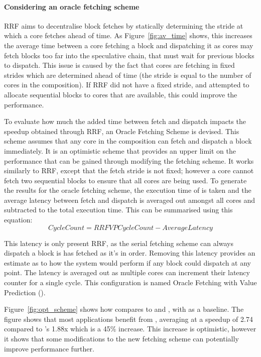 \paragraph*{Considering an oracle fetching scheme}

RRF aims to decentralise block fetches by statically determining the stride at which a core fetches ahead of time.
As Figure~\ref{fig:av_time} shows, this increases the average time between a core fetching a block and dispatching it as cores may fetch blocks too far into the speculative chain, that must wait for previous blocks to dispatch.
This issue is caused by the fact that cores are fetching in fixed strides which are determined ahead of time (the stride is equal to the number of cores in the composition).
If RRF did not have a fixed stride, and attempted to allocate sequential blocks to cores that are available, this could improve the performance. 

To evaluate how much the added time between fetch and dispatch impacts the speedup obtained through RRF, an Oracle Fetching Scheme is devised.
This scheme assumes that any core in the composition can fetch and dispatch a block immediately.
It is an optimistic scheme that provides an upper limit on the performance that can be gained through modifying the fetching scheme. 
It works similarly to RRF, except that the fetch stride is not fixed; however a core cannot fetch two sequential blocks to ensure that all cores are being used.
To generate the results for the oracle fetching scheme, the execution time of \nfvp{} is taken and the average latency between fetch and dispatch is averaged out amongst all cores and subtracted to the total execution time.
This can be summarised using this equation:
\begin{equation}
CycleCount = RRFVP CycleCount - AverageLatency
\end{equation}

This latency is only present RRF, as the serial fetching scheme can always dispatch a block is has fetched as it's in order.
Removing this latency provides an estimate as to how the system would perform if any block could dispatch at any point.
The latency is averaged out as multiple cores can increment their latency counter for a single cycle.
This configuration is named Oracle Fetching with Value Prediction (\optvp).

Figure~\ref{fig:opt_scheme} shows how \optvp{} compares to \vp{} and \nfvp{}, with \novp{} as a baseline.
The figure shows that most applications benefit from \optvp{}, averaging at a speedup of 2.74 compared to \nfvp's 1.88x which is a 45\% increase.
This increase is optimistic, however it shows that some modifications to the new fetching scheme can potentially improve performance further.

